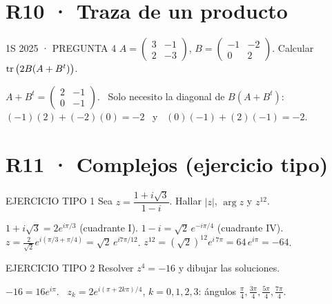 \section*{R10 · Traza de un producto}
\begin{enunciado}{1S 2025 · PREGUNTA 4}
$A=\begin{pmatrix}3&-1\\2&-3\end{pmatrix}$, $B=\begin{pmatrix}-1&-2\\0&2\end{pmatrix}$. Calcular $\operatorname{tr}\big(2B(A+B^t)\big)$.
\end{enunciado}
$A+B^t=\begin{pmatrix}2&-1\\0&-1\end{pmatrix}$. \ Solo necesito la diagonal de $B(A+B^t)$: \ $(-1)(2)+(-2)(0)=-2$ \ y \ $(0)(-1)+(2)(-1)=-2$.

\section*{R11 · Complejos (ejercicio tipo)}
\begin{enunciado}{EJERCICIO TIPO 1}
Sea $z=\dfrac{1+i\sqrt3}{1-i}$. Hallar $|z|$, $\arg z$ y $z^{12}$.
\end{enunciado}
$1+i\sqrt3=2e^{i\pi/3}$ (cuadrante I). \quad $1-i=\sqrt2\,e^{-i\pi/4}$ (cuadrante IV).
$z=\frac2{\sqrt2}e^{i(\pi/3+\pi/4)}=\sqrt2\,e^{i7\pi/12}$.
$z^{12}=(\sqrt2)^{12}e^{i\,7\pi}=64\,e^{i\pi}=-64$.
\begin{enunciado}{EJERCICIO TIPO 2}
Resolver $z^4=-16$ y dibujar las soluciones.
\end{enunciado}
$-16=16e^{i\pi}$. \ $z_k=2e^{i(\pi+2k\pi)/4}$, $k=0,1,2,3$: ángulos $\frac\pi4,\frac{3\pi}4,\frac{5\pi}4,\frac{7\pi}4$.
